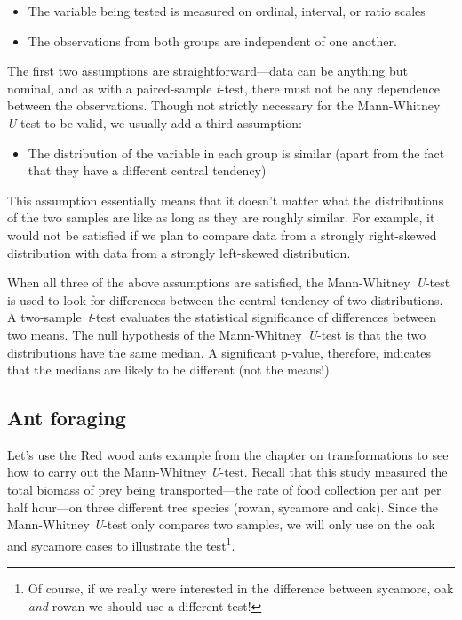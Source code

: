 \documentclass[
]{book}
\providecommand{\tightlist}{%
  \setlength{\itemsep}{0pt}\setlength{\parskip}{0pt}}
\begin{document}
\begin{itemize}
\tightlist
\item
  The variable being tested is measured on ordinal, interval, or ratio scales
\item
  The observations from both groups are independent of one another.
\end{itemize}

The first two assumptions are straightforward---data can be anything but nominal, and as with a paired-sample \emph{t}-test, there must not be any dependence between the observations. Though not strictly necessary for the Mann-Whitney \emph{U}-test to be valid, we usually add a third assumption:

\begin{itemize}
\tightlist
\item
  The distribution of the variable in each group is similar (apart from the fact that they have a different central tendency)
\end{itemize}

This assumption essentially means that it doesn't matter what the distributions of the two samples are like as long as they are roughly similar. For example, it would not be satisfied if we plan to compare data from a strongly right-skewed distribution with data from a strongly left-skewed distribution.

When all three of the above assumptions are satisfied, the Mann-Whitney~\emph{U}-test is used to look for differences between the central tendency of two distributions. A two-sample~\emph{t}-test evaluates the statistical significance of differences between two means. The null hypothesis of the Mann-Whitney~\emph{U}-test is that the two distributions have the same median. A significant p-value, therefore, indicates that the medians are likely to be different (not the means!).

\hypertarget{ant-foraging}{%
\subsection{Ant foraging}\label{ant-foraging}}

Let's use the Red wood ants example from the chapter on transformations to see how to carry out the Mann-Whitney \emph{U}-test. Recall that this study measured the total biomass of prey being transported---the rate of food collection per ant per half hour---on three different tree species (rowan, sycamore and oak). Since the Mann-Whitney \emph{U}-test only compares two samples, we will only use on the oak and sycamore cases to illustrate the test\footnote{Of course, if we really were interested in the difference between sycamore, oak \emph{and} rowan we should use a different test!}.
\end{document}
